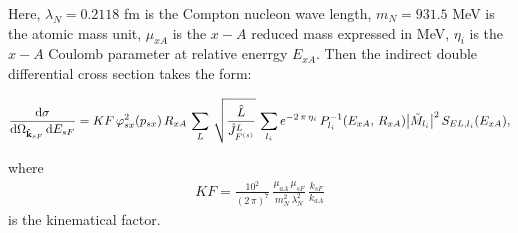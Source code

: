 \documentclass[prl,unsortedaddress,groupedaddress,twocolumn,amsmath,amsfonts,amssymb,showpacs,floatfix,nofootinbib]{revtex4}
\begin{document}
Here, $\lambda_{N}=0.2118$ fm is the Compton nucleon wave length, $m_{N}= 931.5$ MeV is the atomic mass unit, $\mu_{xA}$ is the $x-A$ reduced mass expressed in MeV, $\eta_{i}$ is the $x-A$ Coulomb parameter at relative enerrgy $E_{xA}$.  
Then the indirect double differential cross section takes the form:
\begin{widetext}
\begin{align}
\frac{ {\rm d}\sigma}{  {\rm d}{\Omega}_{  {\rm{\bf {\hat k}}}_{sF} }\, {\rm d}{E_{sF}} }=KF\,\varphi_{sx}^{2}(p_{sx})\,R_{xA}
\,\sum\limits_{L} \,\sqrt{\frac{{\hat L}}{{\hat J}_{F^{(s)}}^{L}}}\,\sum\limits_{l_{i}}e^{-2\,\pi\,\eta_{i}}\,P_{l_{i}}^{-1}(E_{xA},\,R_{xA})\big| {\tilde M}_{l_{i}} \big|^{2}\,S_{EL,l_{i}}(E_{xA}),                                 
\label{doublediffcrsectSfctr1}
\end{align}
\end{widetext}
where 
\begin{align}
KF=  \frac{10^{2}}{(2\,\pi)^{7} }\,\frac{\mu_{aA}\,\mu_{sF}}{m_{N}^{2}\,\lambda_{N}^{2}}\,\frac{ k_{sF}}{k_{aA}}
\label{KF1}
\end{align}
is the kinematical factor.
\end{document}

